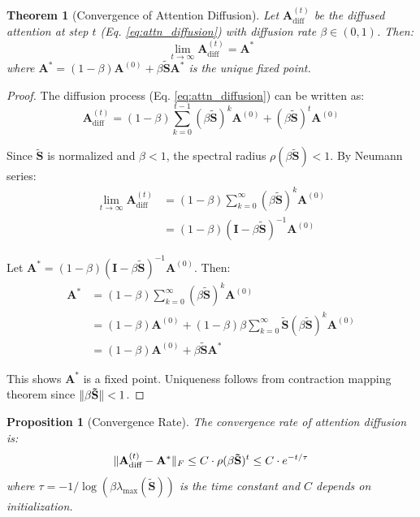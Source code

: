 \documentclass[11pt]{article}
\newtheorem{theorem}{Theorem}
\newtheorem{proof}{Proof}
\newtheorem{proposition}{Proposition}
\DeclarePairedDelimiter{\norm}{\lVert}{\rVert}
\begin{document}
\begin{theorem}[Convergence of Attention Diffusion]
\label{thm:convergence}
Let $\mathbf{A}_{\text{diff}}^{(t)}$ be the diffused attention at step $t$ (Eq. \ref{eq:attn_diffusion}) with diffusion rate $\beta \in (0,1)$. Then:
\begin{equation}
    \lim_{t \to \infty} \mathbf{A}_{\text{diff}}^{(t)} = \mathbf{A}^*
\end{equation}
where $\mathbf{A}^* = (1-\beta) \mathbf{A}^{(0)} + \beta \mathbf{\tilde{S}} \mathbf{A}^*$ is the unique fixed point.
\end{theorem}

\begin{proof}
The diffusion process (Eq. \ref{eq:attn_diffusion}) can be written as:
\begin{equation}
    \mathbf{A}_{\text{diff}}^{(t)} = (1-\beta) \sum_{k=0}^{t-1} (\beta \mathbf{\tilde{S}})^k \mathbf{A}^{(0)} + (\beta \mathbf{\tilde{S}})^t \mathbf{A}^{(0)}
\end{equation}

Since $\mathbf{\tilde{S}}$ is normalized and $\beta < 1$, the spectral radius $\rho(\beta \mathbf{\tilde{S}}) < 1$. By Neumann series:
\begin{align}
    \lim_{t \to \infty} \mathbf{A}_{\text{diff}}^{(t)} &= (1-\beta) \sum_{k=0}^{\infty} (\beta \mathbf{\tilde{S}})^k \mathbf{A}^{(0)} \\
    &= (1-\beta) (\mathbf{I} - \beta \mathbf{\tilde{S}})^{-1} \mathbf{A}^{(0)}
\end{align}

Let $\mathbf{A}^* = (1-\beta) (\mathbf{I} - \beta \mathbf{\tilde{S}})^{-1} \mathbf{A}^{(0)}$. Then:
\begin{align}
    \mathbf{A}^* &= (1-\beta) \sum_{k=0}^{\infty} (\beta \mathbf{\tilde{S}})^k \mathbf{A}^{(0)} \\
    &= (1-\beta) \mathbf{A}^{(0)} + (1-\beta) \beta \sum_{k=0}^{\infty} \mathbf{\tilde{S}} (\beta \mathbf{\tilde{S}})^k \mathbf{A}^{(0)} \\
    &= (1-\beta) \mathbf{A}^{(0)} + \beta \mathbf{\tilde{S}} \mathbf{A}^*
\end{align}

This shows $\mathbf{A}^*$ is a fixed point. Uniqueness follows from contraction mapping theorem since $\norm{\beta \mathbf{\tilde{S}}} < 1$.
\end{proof}

\begin{proposition}[Convergence Rate]
\label{prop:rate}
The convergence rate of attention diffusion is:
\begin{equation}
    \norm{\mathbf{A}_{\text{diff}}^{(t)} - \mathbf{A}^*}_F \leq C \cdot \rho(\beta \mathbf{\tilde{S}})^t \leq C \cdot e^{-t/\tau}
\end{equation}
where $\tau = -1/\log(\beta \lambda_{\max}(\mathbf{\tilde{S}}))$ is the time constant and $C$ depends on initialization.
\end{proposition}
\end{document}

